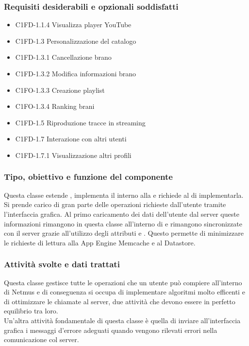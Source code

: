 \subsubsection*{Requisiti desiderabili e opzionali soddisfatti}
\begin{itemize}
    \item C1FD-1.1.4 Visualizza player YouTube
    \item C1FD-1.3 Personalizzazione del catalogo 
    \item C1FD-1.3.1 Cancellazione brano
    \item C1FD-1.3.2 Modifica informazioni brano
    \item C1FO-1.3.3 Creazione playlist
    \item C1FO-1.3.4 Ranking brani
    \item C1FD-1.5 Riproduzione tracce in streaming
    \item C1FD-1.7 Interazione con altri utenti
    \item C1FD-1.7.1 Visualizzazione altri profili
\end{itemize}
\subsubsection*{Tipo, obiettivo e funzione del componente}
Questa classe estende , implementa il 
interno alla  e richiede al  di
implementarla.\\
 Si prende carico di gran parte delle operazioni richieste
dall'utente tramite l'interfaccia grafica. Al primo caricamento dei dati
dell'utente dal server queste informazioni rimangono in questa classe
all'interno di  e rimangono sincronizzate con il
server grazie all'utilizzo degli attributi  e
. Questo permette di minimizzare le richieste di
lettura alla App Engine Memcache e al Datastore. 
\subsubsection*{Attivit\`a svolte e dati trattati} Questa classe gestisce tutte
le operazioni che un utente pu\`o compiere all'interno di Netmus e di
conseguenza si occupa di implementare algoritmi molto efficenti e
di ottimizzare le chiamate al server, due attivit\`a che devono essere in
perfetto equilibrio tra loro.\\
Un'altra attivit\`a fondamentale di questa classe \`e quella di inviare
all'interfaccia grafica i messaggi d'errore adeguati quando vengono rilevati
errori nella comunicazione col server.
\newpage
